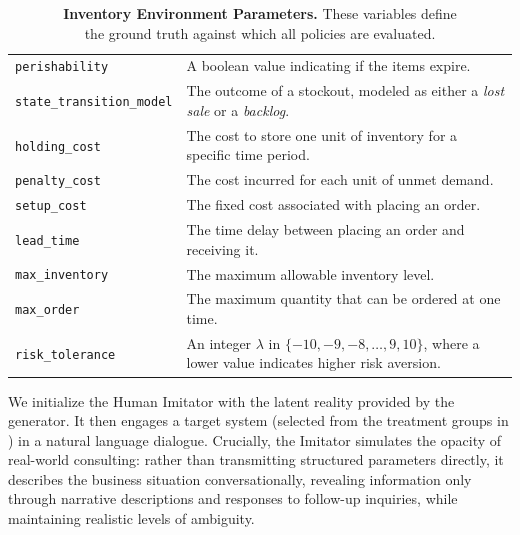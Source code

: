\documentclass[mnsc,nonblindrev]{informs3_hide}
\begin{document}
\begin{description}
\begin{table}[!ht]
\begin{tabular}{
        >{\raggedright\arraybackslash}p{}
        >{\raggedright\arraybackslash}p{}
    }
        \texttt{perishability} &
        A boolean value indicating if the items expire. \\

        \texttt{state\_transition\_model} &
        The outcome of a stockout, modeled as either a \textit{lost sale} or a \textit{backlog}. \\

        \texttt{holding\_cost} &
        The cost to store one unit of inventory for a specific time period. \\

        \texttt{penalty\_cost} &
        The cost incurred for each unit of unmet demand. \\

        \texttt{setup\_cost} &
        The fixed cost associated with placing an order. \\

        \texttt{lead\_time} &
        The time delay between placing an order and receiving it. \\

        \texttt{max\_inventory} &
        The maximum allowable inventory level. \\

        \texttt{max\_order} &
        The maximum quantity that can be ordered at one time. \\

        \texttt{risk\_tolerance} &
        An integer $\lambda$ in $\{ -10,-9, -8, \ldots, 9, 10\}$, where a lower value indicates higher risk aversion. \\
        \bottomrule
    \end{tabular}
    \caption{\textbf{Inventory Environment Parameters.} These variables define \\ the ground truth against which all policies are evaluated.}
    \label{tab:param-definitions}
\end{table}

    
    \item[2. Interaction:]
    We initialize the Human Imitator with the latent reality provided by the generator. It then engages a target system (selected from the treatment groups in ) in a natural language dialogue. Crucially, the Imitator simulates the opacity of real-world consulting: rather than transmitting structured parameters directly, it describes the business situation conversationally, revealing information only through narrative descriptions and responses to follow-up inquiries, while maintaining realistic levels of ambiguity.
    

\end{description}
\end{document}
